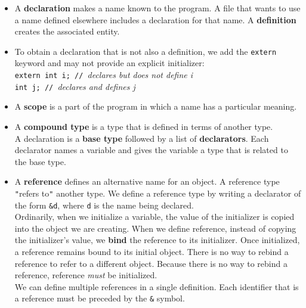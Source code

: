 \begin{itemize}
\item
A \textbf{declaration} makes a name known to the program. A file that wants to use a name defined elsewhere includes a declaration for that name. A \textbf{definition} creates the associated entity.

\item
To obtain a declaration that is not also a definition, we add the \texttt{extern} keyword and may not provide an explicit initializer:\\
\hspace*{1em}\texttt{extern int i; // }\textit{declares but does not define i}\\
\hspace*{1em}\texttt{int j; // }\textit{declares and defines j}

\item
A \textbf{scope} is a part of the program in which a name has a particular meaning.

\item
A \textbf{compound type} is a type that is defined in terms of another type.\\
A declaration is a \textbf{base type} followed by a list of \textbf{declarators}. Each declarator names a variable and gives the variable a type that is related to the base type.

\item
A \textbf{reference} defines an alternative name for an object. A reference type \texttt{"}refers to\texttt{"} another type. We define a reference type by writing a declarator of the form \texttt{\&d}, where \texttt{d} is the name being declared.\\
Ordinarily, when we initialize a variable, the value of the initializer is copied into the object we are creating. When we define reference, instead of copying the initializer's value, we \textbf{bind} the reference to its initializer. Once initialized, a reference remains bound to its initial object. There is no way to rebind a reference to refer to a different object. Because there is no way to rebind a reference, reference \textit{must} be initialized.\\
We can define multiple references in a single definition. Each identifier that is a reference must be preceded by the \texttt{\&} symbol.


\end{itemize}
